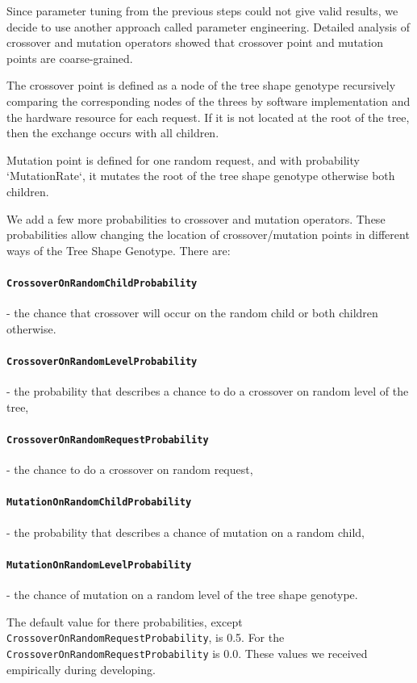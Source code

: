 Since parameter tuning from the previous steps could not give valid results, we decide to use another approach called parameter engineering.
Detailed analysis of crossover and mutation operators showed that crossover point and mutation points are coarse-grained.

The crossover point is defined as a node of the tree shape genotype recursively comparing the corresponding nodes of the threes by software implementation and the hardware resource for each request.
If it is not located at the root of the tree, then the exchange occurs with all children.

Mutation point is defined for one random request, and with probability `MutationRate`, it mutates the root of the tree shape genotype otherwise both children.

We add a few more probabilities to crossover and mutation operators. These probabilities allow changing the location of crossover/mutation points in different ways of the Tree Shape Genotype.
There are:
	\paragraph{\texttt{CrossoverOnRandomChildProbability}} - the chance that crossover will occur on the random child or both children otherwise.
	\paragraph{\texttt{CrossoverOnRandomLevelProbability}} - the probability that describes a chance to do a crossover on random level of the tree, 
	\paragraph{\texttt{CrossoverOnRandomRequestProbability}} - the chance to do a crossover on random request,
	\paragraph{\texttt{MutationOnRandomChildProbability}} - the probability that describes a chance of mutation on a random child,
	\paragraph{\texttt{MutationOnRandomLevelProbability}} - the chance of mutation on a random level of the tree shape genotype.
	
The default value for there probabilities, except \texttt{CrossoverOnRandomRequestProbability}, is 0.5. For the \texttt{CrossoverOnRandomRequestProbability} is 0.0. These values we received empirically during developing.


